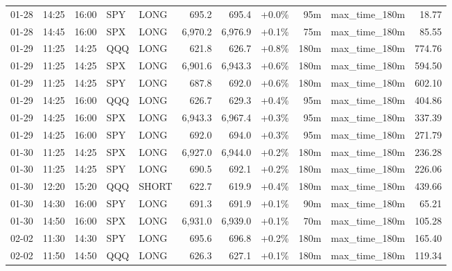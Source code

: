 \documentclass[11pt,a4paper,twoside]{article}
\begin{document}
\begin{center}
\begin{longtable}{>{\color{txtmain}}l l l l l r r r r >{\color{txtmain}}l r}
01-28 & 14:25 & 16:00 & SPY & LONG & 695.2 & 695.4 & \textcolor{wingreen}{+0.0\%} & 95m & max\_time\_180m & \textcolor{wingreen}{18.77} \\
01-28 & 14:45 & 16:00 & SPX & LONG & 6,970.2 & 6,976.9 & \textcolor{wingreen}{+0.1\%} & 75m & max\_time\_180m & \textcolor{wingreen}{85.55} \\
01-29 & 11:25 & 14:25 & QQQ & LONG & 621.8 & 626.7 & \textcolor{wingreen}{+0.8\%} & 180m & max\_time\_180m & \textcolor{wingreen}{774.76} \\
01-29 & 11:25 & 14:25 & SPX & LONG & 6,901.6 & 6,943.3 & \textcolor{wingreen}{+0.6\%} & 180m & max\_time\_180m & \textcolor{wingreen}{594.50} \\
01-29 & 11:25 & 14:25 & SPY & LONG & 687.8 & 692.0 & \textcolor{wingreen}{+0.6\%} & 180m & max\_time\_180m & \textcolor{wingreen}{602.10} \\
01-29 & 14:25 & 16:00 & QQQ & LONG & 626.7 & 629.3 & \textcolor{wingreen}{+0.4\%} & 95m & max\_time\_180m & \textcolor{wingreen}{404.86} \\
01-29 & 14:25 & 16:00 & SPX & LONG & 6,943.3 & 6,967.4 & \textcolor{wingreen}{+0.3\%} & 95m & max\_time\_180m & \textcolor{wingreen}{337.39} \\
01-29 & 14:25 & 16:00 & SPY & LONG & 692.0 & 694.0 & \textcolor{wingreen}{+0.3\%} & 95m & max\_time\_180m & \textcolor{wingreen}{271.79} \\
01-30 & 11:25 & 14:25 & SPX & LONG & 6,927.0 & 6,944.0 & \textcolor{wingreen}{+0.2\%} & 180m & max\_time\_180m & \textcolor{wingreen}{236.28} \\
01-30 & 11:25 & 14:25 & SPY & LONG & 690.5 & 692.1 & \textcolor{wingreen}{+0.2\%} & 180m & max\_time\_180m & \textcolor{wingreen}{226.06} \\
01-30 & 12:20 & 15:20 & QQQ & SHORT & 622.7 & 619.9 & \textcolor{wingreen}{+0.4\%} & 180m & max\_time\_180m & \textcolor{wingreen}{439.66} \\
01-30 & 14:30 & 16:00 & SPY & LONG & 691.3 & 691.9 & \textcolor{wingreen}{+0.1\%} & 90m & max\_time\_180m & \textcolor{wingreen}{65.21} \\
01-30 & 14:50 & 16:00 & SPX & LONG & 6,931.0 & 6,939.0 & \textcolor{wingreen}{+0.1\%} & 70m & max\_time\_180m & \textcolor{wingreen}{105.28} \\
02-02 & 11:30 & 14:30 & SPY & LONG & 695.6 & 696.8 & \textcolor{wingreen}{+0.2\%} & 180m & max\_time\_180m & \textcolor{wingreen}{165.40} \\
02-02 & 11:50 & 14:50 & QQQ & LONG & 626.3 & 627.1 & \textcolor{wingreen}{+0.1\%} & 180m & max\_time\_180m & \textcolor{wingreen}{119.34} \\

\end{longtable}
\end{center}
\end{document}
